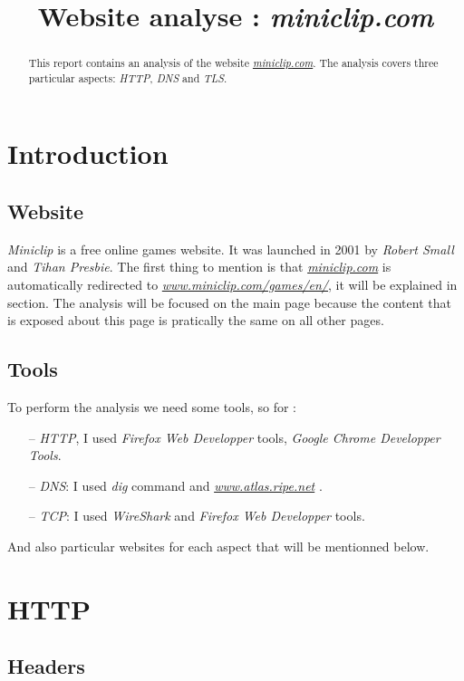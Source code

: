 \documentclass{article}
\title{Website analyse : \textit{miniclip.com}}
\newcommand{\link}[1]{\href{#1}{\textit{#1}}}
\begin{document}
%
\maketitle
%
\begin{abstract}
This report contains an analysis of the website \link{miniclip.com}. The analysis covers three particular aspects: \textit{HTTP}, \textit{DNS} and \textit{TLS}.
\end{abstract}
%
%
\section{Introduction}
\label{sec:intro}
\subsection{Website}
\label{sub:web}
\textit{Miniclip} is a free online games website. It was launched in 2001 by \textit{Robert Small} and \textit{Tihan Presbie}. The first thing to mention is that \link{miniclip.com} is automatically redirected to \link{www.miniclip.com/games/en/}, it will be explained in \textbf{} section. The analysis will be focused on the main page because the content that is exposed about this page is pratically the same on all other pages. 
\subsection{Tools}
\label{sub:tools}
To perform the analysis we need some tools, so for :
\begin{itemize}
    \item[--] \textit{HTTP}, I used \textit{Firefox Web Developper} tools, \textit{Google Chrome Developper Tools}.
    \item[--] \textit{DNS}: I used \textit{dig} command and \link{www.atlas.ripe.net} .
    \item[--] \textit{TCP}: I used \textit{WireShark} and \textit{Firefox Web Developper} tools.
\end{itemize}
And also particular websites for each aspect that will be mentionned below.

\section{HTTP}
\label{sec:HTTP}

\subsection{Headers}
\label{sub:headers}
\end{document}

